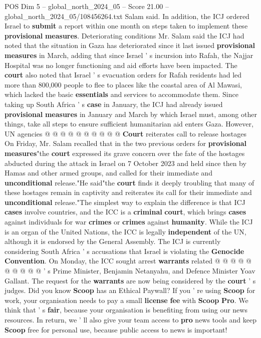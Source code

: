 \begin{textsample}{POS Dim 5 – global\_north\_2024\_05 – Score 21.00 – global\_north\_2024\_05/108456264.txt}
Salam said.
In addition, the ICJ ordered Israel to \textbf{submit} a report within one month on steps taken to implement these \textbf{provisional} \textbf{measures}.
Deteriorating conditions Mr.
Salam said the ICJ had noted that the situation in Gaza has deteriorated since it last issued \textbf{provisional} \textbf{measures} in March, adding that since Israel ' s incursion into Rafah, the Najjar Hospital was no longer functioning and aid efforts have been impacted.
The \textbf{court} also noted that Israel ' s evacuation orders for Rafah residents had led more than 800,000 people to flee to places like the coastal area of Al Mawasi, which lacked the basic \textbf{essentials} and services to accommodate them.
Since taking up South Africa ' s \textbf{case} in January, the ICJ had already issued \textbf{provisional} \textbf{measures} in January and March by which Israel must, among other things, take all steps to ensure sufficient humanitarian aid enters Gaza.
However, UN agencies @ @ @ @ @ @ @ @ @ @ \textbf{Court} reiterates call to release hostages On Friday, Mr.
Salam recalled that in the two previous orders for \textbf{provisional} \textbf{measures}"the \textbf{court} expressed its grave concern over the fate of the hostages abducted during the attack in Israel on 7 October 2023 and held since then by Hamas and other armed groups, and called for their immediate and \textbf{unconditional} release."He said"the \textbf{court} finds it deeply troubling that many of these hostages remain in captivity and reiterates its call for their immediate and \textbf{unconditional} release."The simplest way to explain the difference is that ICJ \textbf{cases} involve countries, and the ICC is a \textbf{criminal} \textbf{court}, which brings \textbf{cases} against individuals for war \textbf{crimes} or \textbf{crimes} against \textbf{humanity}.
While the ICJ is an organ of the United Nations, the ICC is legally \textbf{independent} of the UN, although it is endorsed by the General Assembly.
The ICJ is currently considering South Africa ' s accusations that Israel is violating the \textbf{Genocide} \textbf{Convention}.
On Monday, the ICC sought arrest \textbf{warrants} related @ @ @ @ @ @ @ @ @ @ ' s Prime Minister, Benjamin Netanyahu, and Defence Minister Yoav Gallant.
The request for the \textbf{warrants} are now being considered by the \textbf{court} ' s judges.
Did you know \textbf{Scoop} has an Ethical Paywall?
If you ' re using \textbf{Scoop} for work, your organisation needs to pay a small \textbf{license} \textbf{fee} with \textbf{Scoop} \textbf{Pro}.
We think that ' s \textbf{fair}, because your organisation is benefiting from using our news resources.
In return, we ' ll also give your team access to \textbf{pro} news tools and keep \textbf{Scoop} free for personal use, because public access to news is important!

\end{textsample}
